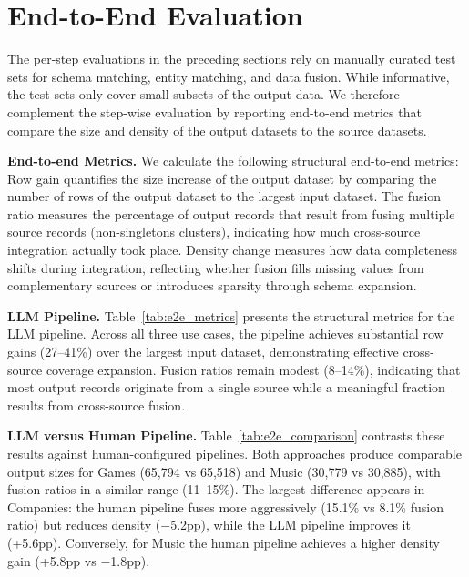 \section{End-to-End Evaluation}
\label{sec:end_to_end}

The per-step evaluations in the preceding sections rely on manually curated test sets for schema matching, entity matching, and data fusion. While informative, the test sets only cover small subsets of the output data. We therefore complement the step-wise evaluation by reporting end-to-end metrics that compare the size and density of the output datasets to the source datasets.

\textbf{End-to-end Metrics.}\label{sec:e2e_metrics} 
We calculate the following structural end-to-end metrics: Row gain quantifies the size increase of the output dataset by comparing the number of rows of the output dataset to the largest input dataset.
The fusion ratio measures the percentage of output records that result from fusing multiple source records (non-singletons clusters), indicating how much cross-source integration actually took place.  Density change measures how data completeness shifts during integration, reflecting whether fusion fills missing values from complementary sources or introduces sparsity through schema expansion. 

\textbf{LLM Pipeline.} \label{sec:e2e_results} Table~\ref{tab:e2e_metrics} presents the structural metrics for the LLM pipeline. Across all three use cases, the pipeline achieves substantial row gains (27--41\%) over the largest input dataset, demonstrating effective cross-source coverage expansion. Fusion ratios remain modest (8--14\%), indicating that most output records originate from a single source while a meaningful fraction results from cross-source fusion. 



\textbf{LLM versus Human Pipeline.} 
Table~\ref{tab:e2e_comparison} contrasts these results against human-configured pipelines. Both approaches produce comparable output sizes for Games (65,794 vs 65,518) and Music (30,779 vs 30,885), with fusion ratios in a similar range (11--15\%). The largest difference appears in Companies: the human pipeline fuses more aggressively (15.1\% vs 8.1\% fusion ratio) but reduces density ($-$5.2pp), while the LLM pipeline improves it (+5.6pp). Conversely, for Music the human pipeline achieves a higher density gain (+5.8pp vs $-$1.8pp).



